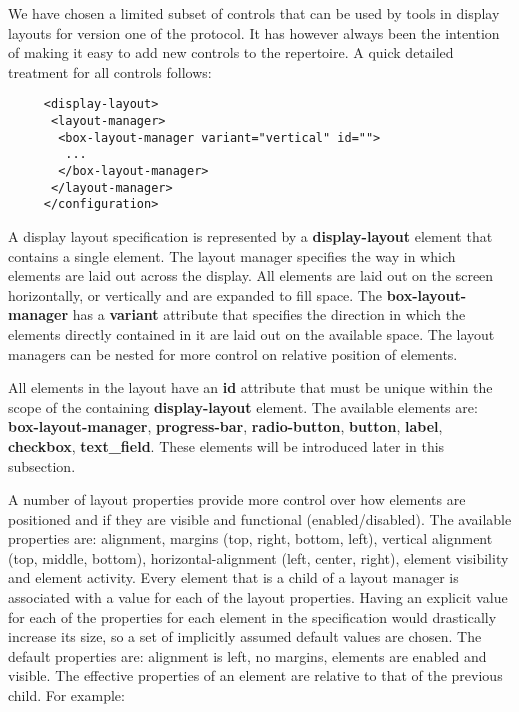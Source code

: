 \documentclass{article}
\begin{document}
   We have chosen a limited subset of controls that can be used by tools in
   display layouts for version one of the protocol. It has however always been
   the intention of making it easy to add new controls to the repertoire. A
   quick detailed treatment for all controls follows:

    \begin{verbatim}
     <display-layout>
      <layout-manager>
       <box-layout-manager variant="vertical" id="">
        ...
       </box-layout-manager>
      </layout-manager>
     </configuration>\end{verbatim}

   A display layout specification is represented by a \textbf{display-layout}
   element that contains a single  element. The layout
   manager specifies the way in which elements are laid out across the display.
   All elements are laid out on the screen horizontally, or vertically and are
   expanded to fill space. The \textbf{box-layout-manager} has a
   \textbf{variant} attribute that specifies the direction in which the
   elements directly contained in it are laid out on the available space. The
   layout managers can be nested for more control on relative position of
   elements.

   All elements in the layout have an \textbf{id} attribute that must be unique
   within the scope of the containing \textbf{display-layout} element. The
   available elements are: \textbf{box-layout-manager}, \textbf{progress-bar},
   \textbf{radio-button}, \textbf{button}, \textbf{label}, \textbf{checkbox},
   \textbf{text\_field}.  These elements will be introduced later in this
   subsection.

   A number of layout properties provide more control over how elements are
   positioned and if they are visible and functional (enabled/disabled). The
   available properties are: alignment, margins (top, right, bottom, left),
   vertical alignment (top, middle, bottom), horizontal-alignment (left,
   center, right), element visibility and element activity. Every element that
   is a child of a layout manager is associated with a value for each of the
   layout properties.  Having an explicit value for each of the properties for
   each element in the specification would drastically increase its size, so a
   set of implicitly assumed default values are chosen.  The default properties
   are: alignment is left, no margins, elements are enabled and visible. The
   effective properties of an element are relative to that of the previous
   child. For example:
\end{document}
